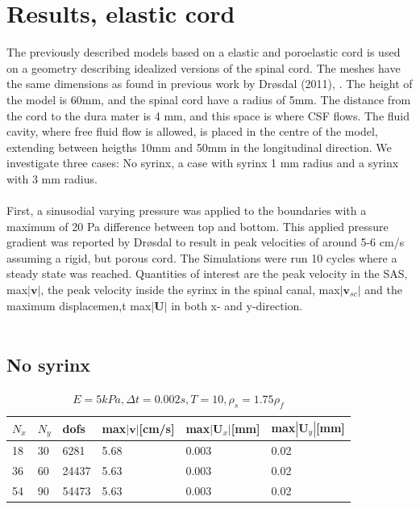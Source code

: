\section{Results, elastic cord}


The previously described models based on a elastic and poroelastic cord is used on a geometry describing idealized versions of the spinal cord. The meshes have the same dimensions as found in previous work by Dr{\o}sdal (2011), \cite{Dros11}. The height of the model is 60mm, and the spinal cord have a radius of 5mm. The distance from the cord to the dura mater is 4 mm, and this space is where CSF flows. The fluid cavity, where free fluid flow is allowed, is placed in the centre of the model, extending between heigths 10mm and 50mm in the longitudinal direction. We investigate three cases: No syrinx, a case with syrinx 1 mm radius and a syrinx with 3 mm radius.  
\\
\\
First, a sinusodial varying pressure was applied to the boundaries with a maximum of 20 Pa difference between top and bottom. This applied pressure gradient was reported by Dr{\o}sdal to result in peak velocities of around 5-6 cm/s assuming a rigid, but porous cord. The Simulations were run 10 cycles where a steady state was reached. Quantities of interest are the peak velocity in the SAS, max$|\mathbf{v}|$, the peak velocity inside the syrinx in the spinal canal, max$|\mathbf{v}_{sc}|$ and the maximum displacemen,t max$|\mathbf{U}|$ in both x- and y-direction.
\\
\\
\subsection{No syrinx}
\begin{table}[!h]
\begin{center}
  \begin{tabular}{l | l | l | l | l | l }
    $N_x$ & $N_y$ & dofs & max$|\mathbf{v}|$[cm/s] & max$|\mathbf{U}_x|$[mm] & max$|\mathbf{U}_y|$[mm] \\ \hline
    18  & 30 & 6281 & 5.68 & 0.003 & 0.02 \\ \hline
	36  & 60 & 24437 & 5.63 & 0.003 & 0.02 \\ \hline
	54  & 90  & 54473 & 5.63 & 0.003 & 0.02 \\ \hline
    \hline
  \end{tabular}
  \end{center}
  \caption{$E = 5 kPa, \Delta t = 0.002s, T = 10, \rho_s = 1.75\rho_f$}
\end{table}

